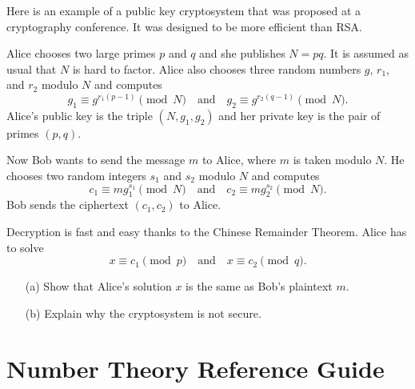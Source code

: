 \documentclass{article}
\begin{document}
    \begin{exercise}
        Here is an example of a public key cryptosystem that was proposed at a cryptography conference.
        It was designed to be more efficient than RSA.

        Alice chooses two large primes \(p\) and \(q\) and she publishes \(N=pq\).
        It is assumed as usual that \(N\) is hard to factor.
        Alice also chooses three random numbers \(g\), \(r_1\), and \(r_2\) modulo \(N\) and computes 
        \[g_1 \equiv g^{r_1(p-1)}\pmod{N}\quad\textrm{and}\quad g_2 \equiv g^{r_2(q-1)}\pmod{N}.\]
        Alice's public key is the triple \((N,g_1,g_2)\) and her private key is the pair of primes \((p,q)\).

        Now Bob wants to send the message \(m\) to Alice, where \(m\) is taken modulo \(N\).
        He chooses two random integers \(s_1\) and \(s_2\) modulo \(N\) and computes
        \[c_1 \equiv mg_1^{s_1}\pmod{N}\quad\textrm{and}\quad c_2 \equiv mg_2^{s_2}\pmod{N}.\]
        Bob sends the ciphertext \((c_1,c_2)\) to Alice.

        Decryption is fast and easy thanks to the Chinese Remainder Theorem.
        Alice has to solve
        \[x\equiv c_1\pmod{p}\quad\textrm{and}\quad x\equiv c_2\pmod{q}.\]

        \begin{enumerate}
            \item[(a)] Show that Alice's solution \(x\) is the same as Bob's plaintext \(m\).
            \item[(b)] Explain why the cryptosystem is not secure. 
        \end{enumerate}
    \end{exercise}
    \iffalse
    Solution:
    \begin{enumerate}
        \item[(a)] Apply Fermat's little theorem to \(c_1\equiv mg_1^{s_1}\equiv mg^{r_1s_1(p-1)}\equiv m\pmod{p}\).
        \item[(b)] By FLT, we have that \(g_1\equiv g^{r_1(p-1)}\equiv 1\pmod{p}\).
        If \(g_1\not\equiv 1\pmod{q}\), Eve computes \(\gcd(g_1-1,N)=p\) easily.
        If \(g_1\equiv 1\pmod{q}\), then \(c_1\equiv m\pmod{N}\), so she can read the message.
        Either way, Eve can recover the message.
    \end{enumerate}
    \fi

\section{Number Theory Reference Guide}
\end{document}
